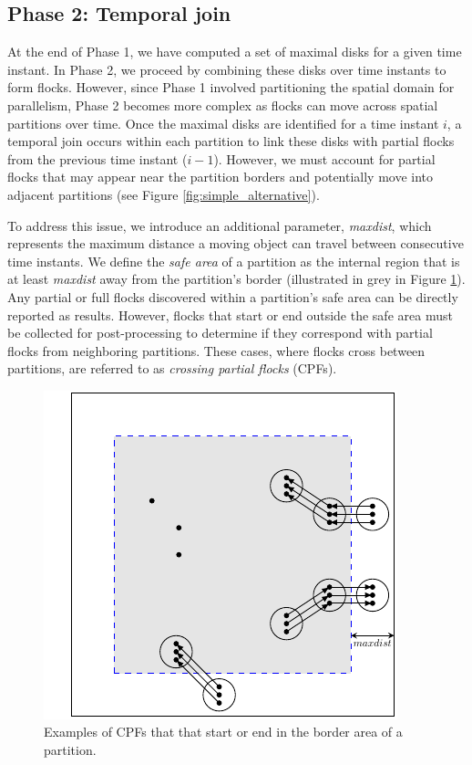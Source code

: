 \subsection{Phase 2: Temporal join}\label{sec:temporal_join}
At the end of Phase 1, we have computed a set of maximal disks for a given time instant. In Phase 2, we proceed by combining these disks over time instants to form flocks. However, since Phase 1 involved partitioning the spatial domain for parallelism, Phase 2 becomes more complex as flocks can move across spatial partitions over time. Once the maximal disks are identified for a time instant $i$, a temporal join occurs within each partition to link these disks with partial flocks from the previous time instant ($i-1$). However, we must account for partial flocks that may appear near the partition borders and potentially move into adjacent partitions (see Figure \ref{fig:simple_alternative}).

To address this issue, we introduce an additional parameter, \textit{maxdist}, which represents the maximum distance a moving object can travel between consecutive time instants. We define the \textit{safe area} of a partition as the internal region that is at least \textit{maxdist} away from the partition’s border (illustrated in grey in Figure \ref{fig:maxdist}). Any partial or full flocks discovered within a partition’s safe area can be directly reported as results. However, flocks that start or end outside the safe area must be collected for post-processing to determine if they correspond with partial flocks from neighboring partitions. These cases, where flocks cross between partitions, are referred to as \textit{crossing partial flocks} (CPFs).

\begin{figure}
    \centering
    \includegraphics[width=0.5\linewidth]{chapter4/figures/maxdist.pdf}
    \caption{Examples of CPFs that that start or end in the border area of a partition.}\label{fig:maxdist}
\end{figure}


